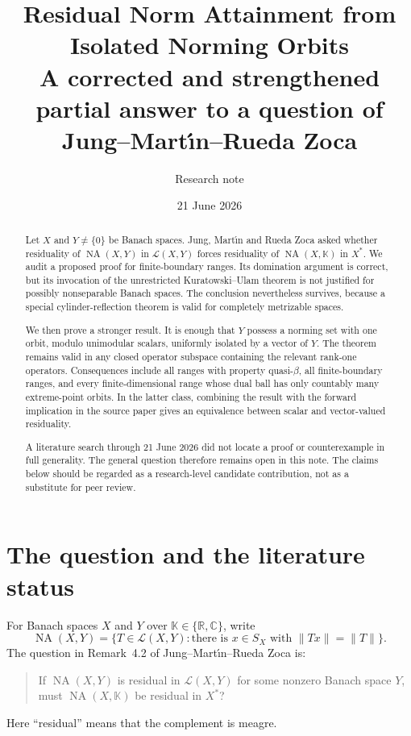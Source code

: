 \documentclass[11pt]{article}
\title{Residual Norm Attainment from Isolated Norming Orbits\\
\large A corrected and strengthened partial answer to a question of Jung--Mart\'{\i}n--Rueda Zoca}
\author{Research note}
\date{21 June 2026}
\theoremstyle{definition}
\theoremstyle{remark}
\newcommand{\K}{\mathbb K}
\newcommand{\NA}{\operatorname{NA}}
\newcommand{\calL}{\mathcal L}
\newcommand{\norm}[1]{\lVert #1\rVert}
\newcommand{\Sphere}{S}
\begin{document}
\maketitle

\begin{abstract}
Let $X$ and $Y\ne\{0\}$ be Banach spaces.  Jung, Mart\'{\i}n and Rueda Zoca asked whether residuality of $\NA(X,Y)$ in $\calL(X,Y)$ forces residuality of $\NA(X,\K)$ in $X^*$.  We audit a proposed proof for finite-boundary ranges.  Its domination argument is correct, but its invocation of the unrestricted Kuratowski--Ulam theorem is not justified for possibly nonseparable Banach spaces.  The conclusion nevertheless survives, because a special cylinder-reflection theorem is valid for completely metrizable spaces.

We then prove a stronger result.  It is enough that $Y$ possess a norming set with one orbit, modulo unimodular scalars, uniformly isolated by a vector of $Y$.  The theorem remains valid in any closed operator subspace containing the relevant rank-one operators.  Consequences include all ranges with property quasi-$\beta$, all finite-boundary ranges, and every finite-dimensional range whose dual ball has only countably many extreme-point orbits.  In the latter class, combining the result with the forward implication in the source paper gives an equivalence between scalar and vector-valued residuality.

A literature search through 21 June 2026 did not locate a proof or counterexample in full generality.  The general question therefore remains open in this note.  The claims below should be regarded as a research-level candidate contribution, not as a substitute for peer review.
\end{abstract}

\section{The question and the literature status}

For Banach spaces $X$ and $Y$ over $\K\in\{\mathbb R,\mathbb C\}$, write
\[
 \NA(X,Y)=\bigl\{T\in\calL(X,Y):\text{there is }x\in\Sphere_X
       \text{ with }\norm{Tx}=\norm{T}\bigr\}.
\]
The question in Remark~4.2 of Jung--Mart\'{\i}n--Rueda Zoca \cite{JMRZ} is:
\begin{quote}
If $\NA(X,Y)$ is residual in $\calL(X,Y)$ for some nonzero Banach space $Y$, must $\NA(X,\K)$ be residual in $X^*$?
\end{quote}
Here ``residual'' means that the complement is meagre.
\end{document}
